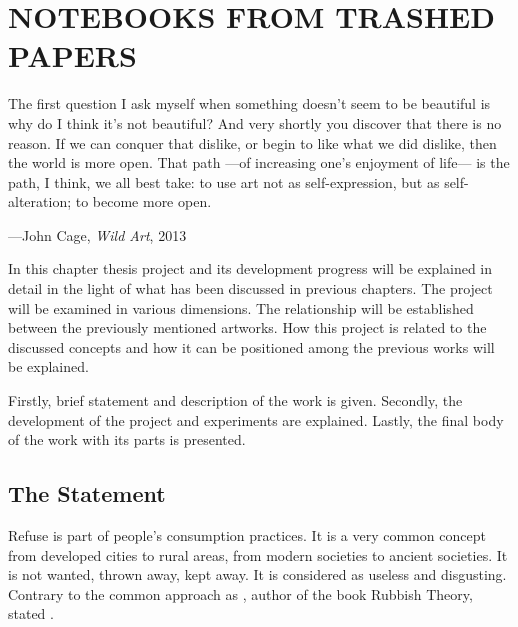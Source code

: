 \chapter{NOTEBOOKS FROM TRASHED PAPERS}




\begin{singlespace}
\epigraph{The first question I ask myself when something doesn't seem to be beautiful is why do I think it's not beautiful? And very shortly you discover that there is no reason. If we can conquer that dislike, or begin to like what we did dislike, then the world is more open. That path ---of increasing one's enjoyment of life--- is the path, I think, we all best take: to use art not as self-expression, but as self-alteration; to become more open.}{\hfill---John Cage, \textit{Wild Art}, 2013}
\end{singlespace}




In this chapter thesis project and its development progress will be explained in detail in the light of what has been discussed in previous chapters. The project will be examined in various dimensions. The relationship will be established between the previously mentioned artworks. How this project is related to the discussed concepts and how it can be positioned among the previous works will be explained.

Firstly, brief statement and description of the work is given. Secondly, the development of the project and experiments are explained. Lastly, the final body of the work with its parts is presented.





%
%
\section{The Statement}
Refuse is part of people’s consumption practices. It is a very common concept from developed cities to rural areas, from modern societies to ancient societies. It is not wanted, thrown away, kept away. It is considered as useless and disgusting. Contrary to the common approach as \cite{thompson1979rubbish}, author of the book Rubbish Theory, stated .

